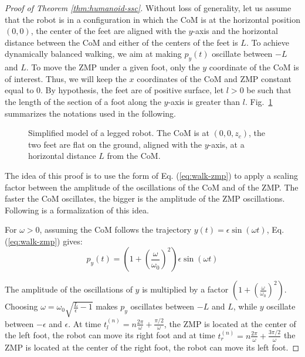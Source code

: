 \documentclass{article}
\begin{document}
\begin{proof}[Proof of Theorem \ref{thm:humanoid-ssc}]
Without loss of generality, let us assume that the robot is in a configuration
in which the CoM is at the horizontal position $(0,0)$, the center of the feet are 
aligned with the $y$-axis and the horizontal distance between the CoM and either of the centers
of the feet is $L$. To achieve dynamically balanced walking, we aim at making
$p_y(t)$ oscillate  between $-L$ and $L$. To move the ZMP  under a
given foot, only  the $y$ coordinate of the CoM  is of interest. Thus,
we will keep the $x$ coordinates  of the CoM and ZMP constant equal to
$0$. By hypothesis, the feet are of positive surface,
let $l>0$ be such that the length of the section of a foot along the 
$y$-axis is greater than $l$. Fig.~\ref{fig:simple-humanoid} summarizes the notations used
in the following.

\begin{figure}[h]
  \centering
  

  \caption{Simplified model of a legged robot. The CoM is at $(0,0,z_c)$, the two feet 
    are flat on the ground, aligned with the $y$-axis, at a horizontal distance $L$ 
    from the CoM.}
  \label{fig:simple-humanoid}
\end{figure}


The idea of this proof is to use the form of Eq. (\ref{eq:walk-zmp}) to
apply a  scaling factor between  the amplitude of the  oscillations of
the CoM and of the ZMP. The faster the CoM oscillates, the bigger is the amplitude
of the ZMP oscillations. Following is a formalization of this  idea.

For $\omega >0$, assuming the CoM follows the trajectory
$y(t) = \epsilon \sin(\omega t)$,  Eq. (\ref{eq:walk-zmp}) gives:
\[
p_y(t) =
(1+\left(\frac{\omega}{\omega_0}\right)^2)\epsilon\sin(\omega t)
\]

The
amplitude  of  the oscillations  of  $y$  is  multiplied by  a  factor
$(1+\left(\frac{\omega}{\omega_0}\right)^2)$.  Choosing  $\omega =
\omega_0 \sqrt{\frac{L}{\epsilon} -1}$ makes  $p_y$ oscillates between $-L$
and    $L$, while $y$ oscillate between $-\epsilon$ and $\epsilon$.   
At    time   $t_l^{(n)}    =    n\frac{2\pi}{\omega}   +
\frac{\pi/2}{\omega}$, the  ZMP is located  at the center of  the left
foot,  the robot  can move  its right  foot and  at time  $t_r^{(n)} =
n\frac{2\pi}{\omega}  + \frac{3\pi/2}{\omega}$ the  ZMP is  located at
the center of the right foot, the robot can move its left foot.


\end{proof}
\end{document}
